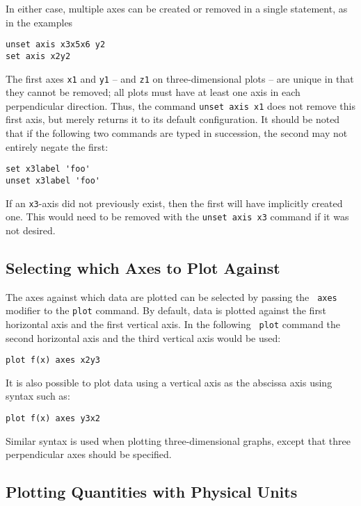 \noindent In either case, multiple axes can be created or removed in a single
statement, as in the examples

\begin{verbatim}
unset axis x3x5x6 y2
set axis x2y2
\end{verbatim}

\noindent The first axes {\tt x1} and {\tt y1} -- and {\tt z1} on
three-dimensional plots -- are unique in that they cannot be removed; all plots
must have at least one axis in each perpendicular direction.  Thus, the command
{\tt unset axis x1} does not remove this first axis, but merely returns it to
its default configuration.  It should be noted that if the following two
commands are typed in succession, the second may not entirely negate the first:

\begin{verbatim}
set x3label 'foo'
unset x3label 'foo'
\end{verbatim}

\noindent If an {\tt x3}-axis did not previously exist, then the first will
have implicitly created one. This would need to be removed with the {\tt unset
axis x3} command if it was not desired.

\subsection{Selecting which Axes to Plot Against}

The axes against which data are plotted can be selected by passing the {\tt
axes} modifier to the {\tt plot} command. By default, data is plotted against
the first horizontal axis and the first vertical axis. In the following {\tt
plot} command the second horizontal axis and the third vertical axis would be
used:
\begin{verbatim}
plot f(x) axes x2y3
\end{verbatim}
It is also possible to plot data using a vertical axis as the abscissa axis
using syntax such as:
\begin{verbatim}
plot f(x) axes y3x2
\end{verbatim}
Similar syntax is used when plotting three-dimensional graphs, except that
three perpendicular axes should be specified.

\subsection{Plotting Quantities with Physical Units}
\label{sec:set_axisunitstyle}

